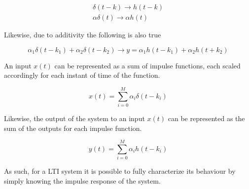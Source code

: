 \documentclass[a4paper,12pt]{article}
\begin{document}
\begin{align*}
 \delta (t-k) \rightarrow h(t-k) \\
 \alpha \delta (t) \rightarrow \alpha h(t)
\end{align*}

Likewise, due to additivity the following is also true

\begin{equation*}
 \alpha_1 \delta (t - k_1) +  \alpha_2 \delta (t-k_2) \rightarrow y = \alpha_1 h(t-k_1)  + \alpha_2 h(t+k_2)
\end{equation*}

An input $x(t)$ can be represented as a sum of impulse functions, each scaled accordingly for each instant of time of the function.

\begin{equation*}
 x (t) = \sum_{i = 0}^M \alpha_i \delta(t-k_i)
\end{equation*}

Likewise, the output of the system to an input $x(t)$ can be represented as the sum of the outputs for each impulse function.

\begin{equation*}
 y(t) = \sum_{i = 0}^M \alpha_i h(t-k_i)
\end{equation*}

As such, for a LTI system it is possible to fully characterize its behaviour by simply knowing the impulse response of the system.


\end{document}

